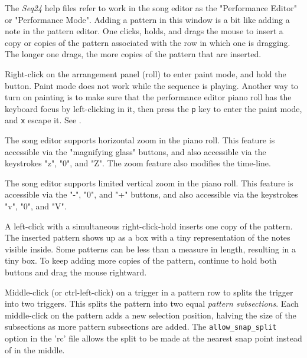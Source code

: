    The \textsl{Seq24} help files refer to work in the song editor as the
   "Performance Editor" or "Performance Mode".  Adding a pattern in this
   window is a bit like adding a note in the pattern editor.
   One clicks, holds, and drags the mouse to insert a copy or copies of the
   pattern associated with the row in which one is dragging.
   The longer one drags, the more copies of the pattern that are inserted.

	Right-click on the arrangement panel (roll) to enter
   paint mode, and hold the button.
   Paint mode does not work while the sequence is playing.
   Another way to turn on painting is to
   make sure that the performance editor piano roll has the
   keyboard focus by left-clicking in it, then press the
   \texttt{p} key to enter the paint mode, and
   \texttt{x} escape it.
   See .

   The song editor supports horizontal zoom in the piano roll.
   This feature is accessible via the "magnifying glass" buttons, and also
   accessible via the keystrokes "z", "0", and "Z".
   The zoom feature also modifies the time-line.

   The song editor supports limited vertical zoom in the piano roll.
   This feature is accessible via the "-", "0", and "+" buttons, and also
   accessible via the keystrokes "v", "0", and "V".

   A left-click with a simultaneous right-click-hold inserts one copy of the
   pattern.  The inserted pattern shows up as a box with a tiny
   representation of the notes visible inside.  Some patterns can
   be less than a measure in length, resulting in a tiny box.
   To keep adding more copies of the pattern, continue to hold both buttons
   and drag the mouse rightward.

   Middle-click (or ctrl-left-click) on a trigger in a pattern row
   to splits the trigger into two triggers.
   This splits the pattern into two equal \textsl{pattern subsections}.
   Each middle-click on the pattern adds a new selection position,
   halving the size of the subsections as more pattern subsections are
   added.  The \texttt{allow\_snap\_split} option in the 'rc' file
   allows the split to be made at the nearest snap point instead of in the
   middle.

